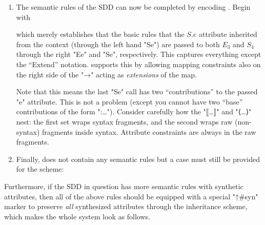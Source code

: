 \documentclass[11pt]{article} %
\begin{document}
\begin{example}
\begin{enumerate}
  \item The semantic rules of the SDD can now be completed by encoding . Begin with
    which merely establishes that the basic rules that the $S.e$ attribute inherited from the
    context (through the left hand "Se") are passed to both $E_3$ and $S_4$ through the right "Ee"
    and "Se", respectively. This captures everything except the ``Extend'' notation. \HAX supports
    this by allowing mapping constraints also on the right side of the "→" acting as
    \emph{extensions} of the map.
    Note that this means the last "Se" call has two ``contributions'' to the passed "e"
    attribute. This is not a problem (except you cannot have two ``base'' contributions of the form
    "{:…}").  Consider carefully how the "⟦…⟧" and "⟨…⟩" nest: the first set wraps syntax fragments,
    and the second wraps raw (non-syntax) fragments inside syntax. Attribute constraints are always
    in the raw fragments.

  \item Finally,  does not contain any semantic rules but a case must still be provided
    for the scheme:

  \end{enumerate}
  Furthermore, if the SDD in question has more semantic rules with synthetic attributes, then all of
  the above rules should be equipped with a special "↑#syn" marker to preserve \emph{all}
  synthesized attributes through the inheritance scheme, which makes the whole system look as
  follows.
\end{example}
\end{document}
